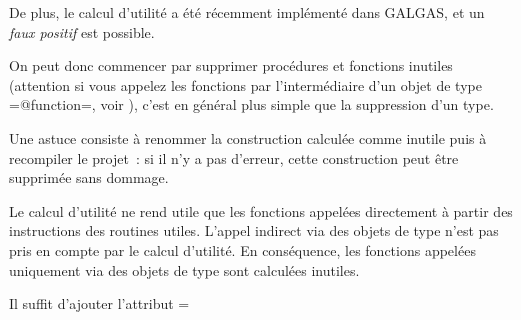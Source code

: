 De plus, le calcul d'utilité a été récemment implémenté dans GALGAS, et un \emph{faux positif} est possible.

On peut donc commencer par supprimer procédures et fonctions inutiles (attention si vous appelez les fonctions par l'intermédiaire d'un objet de type \ggs=@function=, voir ), c'est en général plus simple que la suppression d'un type.

Une astuce consiste à renommer la construction calculée comme inutile puis à recompiler le projet~: si il n'y a pas d'erreur, cette construction peut être supprimée sans dommage.



Le calcul d'utilité ne rend utile que les fonctions appelées directement à partir des instructions des routines utiles. L'appel indirect via des objets de type  n'est pas pris en compte par le calcul d'utilité. En conséquence, les fonctions appelées uniquement via des objets de type  sont calculées inutiles.

Il suffit d'ajouter l'attribut \ggs=%


 